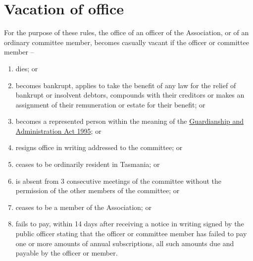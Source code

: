 \section{Vacation of office}
\label{rule:vacation}

For the purpose of these rules, the office of an officer of the Association, or of an ordinary committee member, becomes casually vacant if the officer or committee member --
\begin{enumerate}
	\item dies; or
	\item becomes bankrupt, applies to take the benefit of any law for the relief of bankrupt or insolvent debtors, compounds with their creditors or makes an assignment of their remuneration or estate for their benefit; or
	\item becomes a represented person within the meaning of the \href{https://www.legislation.tas.gov.au/view/html/inforce/current/act-1995-044}{Guardianship and Administration Act 1995}; or
	\item resigns office in writing addressed to the committee; or
	\item ceases to be ordinarily resident in Tasmania; or
	\item is absent from 3 consecutive meetings of the committee without the permission of the other members of the committee; or
	\item ceases to be a member of the Association; or
	\item fails to pay, within 14 days after receiving a notice in writing signed by the public officer stating that the officer or committee member has failed to pay one or more amounts of annual subscriptions, all such amounts due and payable by the officer or member.
\end{enumerate}